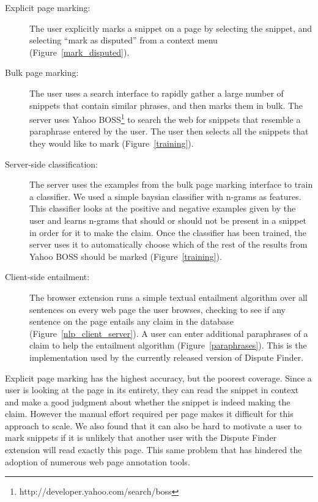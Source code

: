 \documentclass{www2010-submission}
\newcommand{\todo}[1]{}
\begin{document}
\begin{description}
\item[Explicit page marking:] The user explicitly marks a snippet on a page by selecting the snippet, and selecting ``mark as disputed'' from a context menu (Figure~\ref{mark_disputed}).

\item[Bulk page marking:] The user uses a search interface to rapidly gather a large number of snippets that contain similar phrases, and then marks them in bulk. The server uses Yahoo BOSS\footnote{http://developer.yahoo.com/search/boss} to search the web for snippets that resemble a paraphrase entered by the user. The user then selects all the snippets that they would like to mark (Figure~\ref{training}).

\item[Server-side classification:] The server uses the examples from the bulk page marking interface to train a classifier. We used a simple baysian classifier with n-grams as features. This classifier looks at the positive and negative examples given by the user and learns n-grams that should or should not be present in a snippet in order for it to make the claim.  Once the classifier has been trained, the server uses it to automatically choose which of the rest of the results from Yahoo BOSS should be marked (Figure~\ref{training}).

\todo{Should we say that we didn't completely finish this version?}

\todo{Has anyone done something like this before.}
\todo{We only partially implemented this approach}

\item[Client-side entailment:] The browser extension runs a simple textual entailment algorithm over all sentences on every web page the user browses, checking to see if any sentence on the page entails any claim in the database (Figure~\ref{nlp_client_server}). A user can enter additional paraphrases of a claim to help the entailment algorithm (Figure~\ref{paraphrases}). This is the implementation used by the currently released version of Dispute Finder.
\end{description}

Explicit page marking has the highest accuracy, but the poorest coverage. Since a user is looking at the page in its entirety, they can read the snippet in context and make a good judgment about whether the snippet is indeed making the claim. However the manual effort required per page makes it difficult for this approach to scale. We also found that it can also be hard to motivate a user to mark snippets if it is unlikely that another user with the Dispute Finder extension will read exactly this page. This same problem that has hindered the adoption of numerous web page annotation tools.
\end{document}
